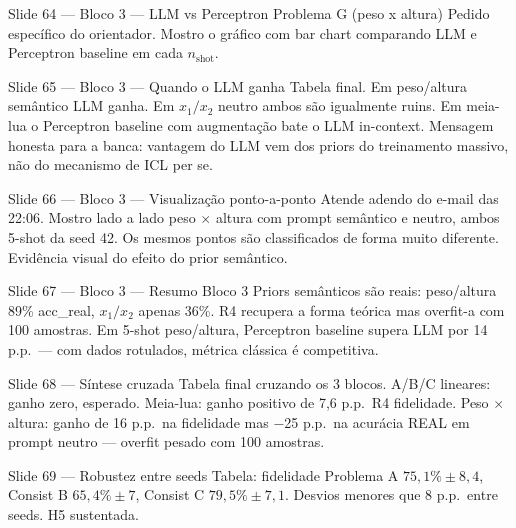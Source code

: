 \documentclass[aspectratio=169,10pt]{beamer}
\begin{document}
\begin{frame}{Slide 64 --- Bloco 3 --- LLM vs Perceptron Problema G (peso x altura)}
\footnotesize
Pedido espec\'ifico do orientador. Mostro o gr\'afico com bar chart comparando LLM e Perceptron baseline em cada $n_{\text{shot}}$.
\end{frame}

\begin{frame}{Slide 65 --- Bloco 3 --- Quando o LLM ganha}
\footnotesize
Tabela final. Em peso/altura sem\^antico LLM ganha. Em $x_1/x_2$ neutro ambos s\~ao igualmente ruins. Em meia-lua o Perceptron baseline com augmenta\c{c}\~ao bate o LLM in-context. Mensagem honesta para a banca: vantagem do LLM vem dos priors do treinamento massivo, n\~ao do mecanismo de ICL per se.
\end{frame}

\begin{frame}{Slide 66 --- Bloco 3 --- Visualiza\c{c}\~ao ponto-a-ponto}
\footnotesize
Atende adendo do e-mail das 22:06. Mostro lado a lado peso $\times$ altura com prompt sem\^antico e neutro, ambos 5-shot da seed 42. Os mesmos pontos s\~ao classificados de forma muito diferente. Evid\^encia visual do efeito do prior sem\^antico.
\end{frame}

\begin{frame}{Slide 67 --- Bloco 3 --- Resumo Bloco 3}
\footnotesize
Priors sem\^anticos s\~ao reais: peso/altura 89\% acc\_real, $x_1/x_2$ apenas 36\%. R4 recupera a forma te\'orica mas overfit-a com 100 amostras. Em 5-shot peso/altura, Perceptron baseline supera LLM por 14 p.p.\ --- com dados rotulados, m\'etrica cl\'assica \'e competitiva.
\end{frame}

\begin{frame}{Slide 68 --- S\'intese cruzada}
\footnotesize
Tabela final cruzando os 3 blocos. A/B/C lineares: ganho zero, esperado. Meia-lua: ganho positivo de 7,6 p.p.\ R4 fidelidade. Peso $\times$ altura: ganho de 16 p.p.\ na fidelidade mas $-$25 p.p.\ na acur\'acia REAL em prompt neutro --- overfit pesado com 100 amostras.
\end{frame}

\begin{frame}{Slide 69 --- Robustez entre seeds}
\footnotesize
Tabela: fidelidade Problema A $75{,}1\% \pm 8{,}4$, Consist B $65{,}4\% \pm 7$, Consist C $79{,}5\% \pm 7{,}1$. Desvios menores que 8 p.p.\ entre seeds. H5 sustentada.
\end{frame}
\end{document}
